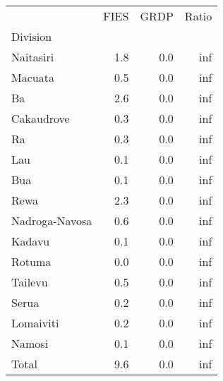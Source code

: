 \begin{tabular}{lrrr}
\toprule
{} &  FIES &  GRDP &  Ratio \\
Division       &       &       &        \\
\midrule
Naitasiri      &   1.8 &   0.0 &    inf \\
Macuata        &   0.5 &   0.0 &    inf \\
Ba             &   2.6 &   0.0 &    inf \\
Cakaudrove     &   0.3 &   0.0 &    inf \\
Ra             &   0.3 &   0.0 &    inf \\
Lau            &   0.1 &   0.0 &    inf \\
Bua            &   0.1 &   0.0 &    inf \\
Rewa           &   2.3 &   0.0 &    inf \\
Nadroga-Navosa &   0.6 &   0.0 &    inf \\
Kadavu         &   0.1 &   0.0 &    inf \\
Rotuma         &   0.0 &   0.0 &    inf \\
Tailevu        &   0.5 &   0.0 &    inf \\
Serua          &   0.2 &   0.0 &    inf \\
Lomaiviti      &   0.2 &   0.0 &    inf \\
Namosi         &   0.1 &   0.0 &    inf \\
Total          &   9.6 &   0.0 &    inf \\
\bottomrule
\end{tabular}
